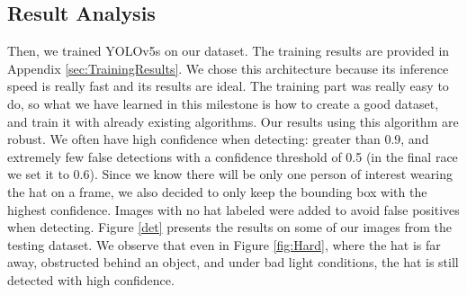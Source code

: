 \documentclass[10pt,conference,compsocconf]{IEEEtran}
\begin{document}
\subsection{Result Analysis}
Then, we trained YOLOv5s on our dataset. The training results are provided in Appendix \ref{sec:TrainingResults}. We chose this architecture because its inference speed is really fast and its results are ideal. The training part was really easy to do, so what we have learned in this milestone is how to create a good dataset, and train it with already existing algorithms. Our results using this algorithm are robust. We often have high confidence when detecting: greater than 0.9, and extremely few false detections with a confidence threshold of 0.5 (in the final race we set it to 0.6). Since we know there will be only one person of interest wearing the hat on a frame, we also decided to only keep the bounding box with the highest confidence. Images with no hat labeled were added to avoid false positives when detecting. Figure \ref{det} presents the results on some of our images from the testing dataset. We observe that even in Figure \ref{fig:Hard}, where the hat is far away, obstructed behind an object, and under bad light conditions, the hat is still detected with high confidence.
\end{document}

